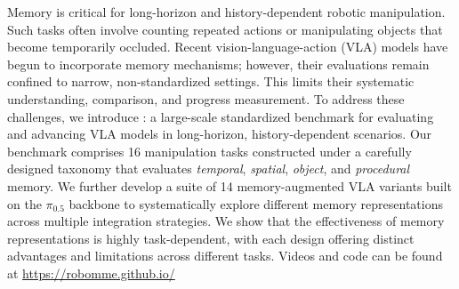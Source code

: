Memory is critical for long-horizon and history-dependent robotic manipulation. 
Such tasks often involve counting repeated actions or manipulating objects that become temporarily occluded.
Recent vision-language-action (VLA) models have begun to incorporate memory mechanisms; however, their evaluations remain confined to narrow, non-standardized settings. This limits their systematic understanding, comparison, and progress measurement. 
To address these challenges, we introduce \textbf{\benchname}: a large-scale standardized benchmark for evaluating and advancing VLA models in long-horizon, history-dependent scenarios. Our benchmark comprises 16 manipulation tasks constructed under a carefully designed taxonomy that evaluates \textit{temporal}, \textit{spatial}, \textit{object}, and \textit{procedural} memory.
We further develop a suite of 14 memory-augmented VLA variants built on the $\pi_{0.5}$ backbone to systematically explore different memory representations across multiple integration strategies.
We show that the effectiveness of memory representations is highly task-dependent, with each design offering distinct advantages and limitations across different tasks. 
Videos and code can be found at \url{https://robomme.github.io/}